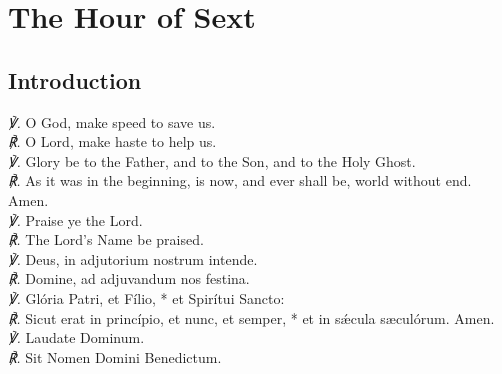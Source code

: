 \section{The Hour of Sext}
\subsection{Introduction}
\englat
{%
\textit{\scshape ℣.} O God, {} make speed to save us.\\
\textit{\scshape ℟.} O Lord, make haste to help us.\\
\textit{\scshape ℣.} Glory be to the Father, and to the Son, and to the Holy Ghost.\\
\textit{\scshape ℟.} As it was in the beginning, is now, and ever shall be, world without end. Amen.\\
\textit{\scshape ℣.} Praise ye the Lord.\\
\textit{\scshape ℟.} The Lord's Name be praised.\\
}
{%
\textit{\scshape ℣.} Deus, {} in adjutorium nostrum intende.\\
\textit{\scshape ℟.} Domine, ad adjuvandum nos festina.\\
\textit{\scshape ℣.} Glória Patri, et Fílio, * et Spirítui Sancto:\\
\textit{\scshape ℟.} Sicut erat in princípio, et nunc, et semper, * et in sǽcula s{\ae}culórum. Amen.\\
\textit{\scshape ℣.} Laudate Dominum.\\
\textit{\scshape ℟.} Sit Nomen Domini Benedictum.\\
}
